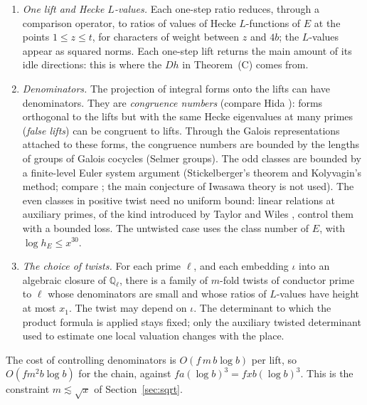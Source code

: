 \documentclass[11pt]{amsart}
\numberwithin{equation}{section}
\theoremstyle{definition}
\theoremstyle{remark}
\newcommand{\Q}{\mathbb Q}
\begin{document}
\begin{enumerate}[leftmargin=2em]
\begin{equation}
\end{equation}
where $Z_j$ is the determinant of a lift $W_j\to V_j$ between spaces of ranks $r$ and $r+t$, on the good forms. These are comparison lifts, not the successive maps of the chain (Section~\ref{sec:det}). This rests on an \emph{exchange identity} of Siegel--Weil type: two theta integrals over unitary groups of complementary rank agree up to a factor $c$ with $|c|^2$ a constant times a product of powers of residue-field cardinalities and of squared absolute values of partial $L$-values. Paths through a grid of spaces joined by lifts and transposed lifts are moved, one square at a time, in $m^2$ steps.
\item \emph{One lift and Hecke $L$-values.} Each one-step ratio reduces, through a comparison operator, to ratios of values of Hecke $L$-functions of $E$ at the points $1\le z\le t$, for characters of weight between $z$ and $4b$; the $L$-values appear as squared norms. Each one-step lift returns the main amount of its idle directions: this is where the $Dh$ in Theorem~(C) comes from.
\item \emph{Denominators.} The projection of integral forms onto the lifts can have denominators. They are \emph{congruence numbers} (compare Hida \cite{hida}): forms orthogonal to the lifts but with the same Hecke eigenvalues at many primes (\emph{false lifts}) can be congruent to lifts. Through the Galois representations attached to these forms, the congruence numbers are bounded by the lengths of groups of Galois cocycles (Selmer groups). The odd classes are bounded by a finite-level Euler system argument (Stickelberger's theorem and Kolyvagin's method; compare \cite{rubin,CoatesSinnott}; the main conjecture of Iwasawa theory is not used). The even classes in positive twist need no uniform bound: linear relations at auxiliary primes, of the kind introduced by Taylor and Wiles \cite{TW}, control them with a bounded loss. The untwisted case uses the class number of $E$, with $\log h_E\le x^{30}$.
\item \emph{The choice of twists.} For each prime $\ell$, and each embedding $\iota$ into an algebraic closure of $\Q_\ell$, there is a family of $m$-fold twists of conductor prime to $\ell$ whose denominators are small and whose ratios of $L$-values have height at most $x_1$. The twist may depend on $\iota$. The determinant to which the product formula is applied stays fixed; only the auxiliary twisted determinant used to estimate one local valuation changes with the place.
\end{enumerate}
The cost of controlling denominators is $O(f\,m\,b\log b)$ per lift, so $O(fm^2b\log b)$ for the chain, against $fa(\log b)^3=fxb(\log b)^3$. This is the constraint $m\lesssim\sqrt x$ of Section~\ref{sec:sqrt}.
\end{document}
